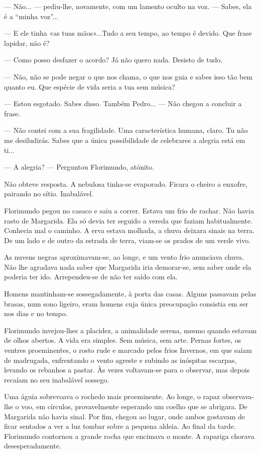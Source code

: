 --- Não... --- pediu-lhe, novamente, com um lamento oculto na voz. --- Sabes,
ela é a ``minha voz''...

--- E ele tinha «as tuas mãos»...Tudo a seu tempo, ao tempo é devido. Que
frase lapidar, não é?

--- Como posso desfazer o acordo? Já não quero nada. Desisto de tudo.

--- Não, não se pode negar o que nos chama, o que nos guia e sabes isso
tão bem quanto eu. Que espécie de vida seria a tua sem música?

--- Estou esgotado. Sabes disso. Também Pedro... --- Não chegou a concluir a
frase.

--- Não contei com a sua fragilidade. Uma característica humana, claro. Tu
não me desiludirás. Sabes que a única possibilidade de celebrares a
alegria está em ti...

--- A alegria? --- Perguntou Florimundo, atónito.

Não obteve resposta. A nebulosa tinha-se evaporado. Ficara o cheiro a
enxofre, pairando no sítio. Inabalável.

Florimundo pegou no casaco e saiu a correr. Estava um frio de rachar.
Não havia rasto de Margarida. Ela só devia ter seguido a vereda que
faziam habitualmente. Conhecia mal o caminho. A erva estava molhada, a
chuva deixara sinais na terra. De um lado e de outro da estrada de
terra, viam-se os prados de um verde vivo.

As nuvens negras aproximavam-se, ao longe, e um vento frio anunciava
chuva. Não lhe agradava nada saber que Margarida iria demorar-se, sem
saber onde ela poderia ter ido. Arrependeu-se de não ter saído com ela.

Homens mantinham-se sossegadamente, à porta das casas. Alguns passavam
pelas brasas, num sono ligeiro, eram homens cuja única preocupação
consistia em ser nos dias e no tempo.

Florimundo invejou-lhes a placidez, a animalidade serena, mesmo quando
estavam de olhos abertos. A vida era simples. Sem música, sem arte.
Pernas fortes, os ventres proeminentes, o rosto rude e marcado pelos
frios Invernos, em que saíam de madrugada, enfrentando o vento agreste e
subindo as inóspitas escarpas, levando os rebanhos a pastar. Às vezes
voltavam-se para o observar, mas depois recaíam no seu inabalável
sossego.

Uma águia sobrevoava o rochedo mais proeminente. Ao longe, o rapaz
observava-lhe o voo, em círculos, provavelmente esperando um coelho que
se abrigara. De Margarida não havia sinal. Por fim, chegou ao lugar,
onde ambos gostavam de ficar sentados a ver a luz tombar sobre a pequena
aldeia. Ao final da tarde. Florimundo contornou a grande rocha que
encimava o monte. A rapariga chorava desesperadamente.

